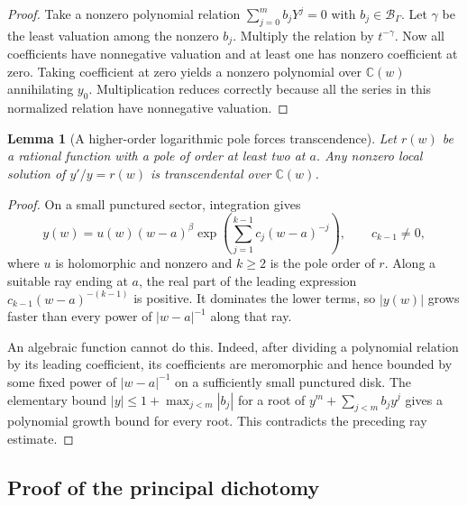 \documentclass[11pt,a4paper]{article}
\numberwithin{equation}{section}
\newtheorem{lemma}[theorem]{Lemma}
\theoremstyle{definition}
\theoremstyle{remark}
\newcommand{\C}{\mathbb C}
\newcommand{\B}{\mathscr B_\Gamma}
\begin{document}
\begin{proof}
Take a nonzero polynomial relation $\sum_{j=0}^m b_jY^j=0$ with
$b_j\in\B$.  Let $\gamma$ be the least valuation among the nonzero $b_j$.
Multiply the relation by $t^{-\gamma}$.  Now all coefficients have
nonnegative valuation and at least one has nonzero coefficient at zero.
Taking coefficient at zero yields a nonzero polynomial over $\C(w)$
annihilating $y_0$.  Multiplication reduces correctly because all the
series in this normalized relation have nonnegative valuation.
\end{proof}

\begin{lemma}[A higher-order logarithmic pole forces transcendence]
\label{lem:essential}
Let $r(w)$ be a rational function with a pole of order at least two at
$a$.  Any nonzero local solution of $y'/y=r(w)$ is transcendental over
$\C(w)$.
\end{lemma}

\begin{proof}
On a small punctured sector, integration gives
\[
 y(w)=u(w)(w-a)^\beta
       \exp\!\left(\sum_{j=1}^{k-1}c_j(w-a)^{-j}\right),
 \qquad c_{k-1}\ne0,
\]
where $u$ is holomorphic and nonzero and $k\ge2$ is the pole order of $r$.
Along a suitable ray ending at $a$, the real part of the leading expression
$c_{k-1}(w-a)^{-(k-1)}$ is positive.  It dominates the lower terms, so
$|y(w)|$ grows faster than every power of $|w-a|^{-1}$ along that ray.

An algebraic function cannot do this.  Indeed, after dividing a polynomial
relation by its leading coefficient, its coefficients are meromorphic and
hence bounded by some fixed power of $|w-a|^{-1}$ on a sufficiently small
punctured disk.  The elementary bound
$|y|\le1+\max_{j<m}|b_j|$ for a root of
$y^m+\sum_{j<m}b_j y^j$ gives a polynomial growth bound for every root.
This contradicts the preceding ray estimate.
\end{proof}

\subsection{Proof of the principal dichotomy}
\end{document}
